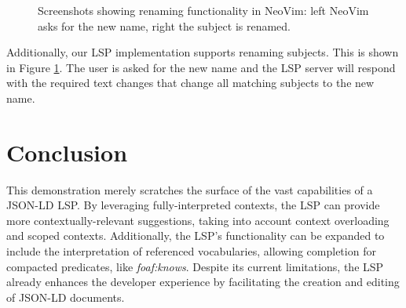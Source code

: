 \documentclass[
]{ceurart}
\begin{document}
\begin{figure}
\centering
{}
\caption{Screenshots showing renaming functionality in NeoVim: left NeoVim asks for the new name, right the subject is renamed.}
\label{fig:rename}
\end{figure}

Additionally, our LSP implementation supports renaming subjects. This is shown in Figure \ref{fig:rename}. The user is asked for the new name and the LSP server will respond with the required text changes that change all matching subjects to the new name.


\section{Conclusion}

This demonstration merely scratches the surface of the vast capabilities of a JSON-LD LSP. By leveraging fully-interpreted contexts, the LSP can provide more contextually-relevant suggestions, taking into account context overloading and scoped contexts. Additionally, the LSP's functionality can be expanded to include the interpretation of referenced vocabularies, allowing completion for compacted predicates, like \textit{foaf:knows}. Despite its current limitations, the LSP already enhances the developer experience by facilitating the creation and editing of JSON-LD documents.



\end{document}
